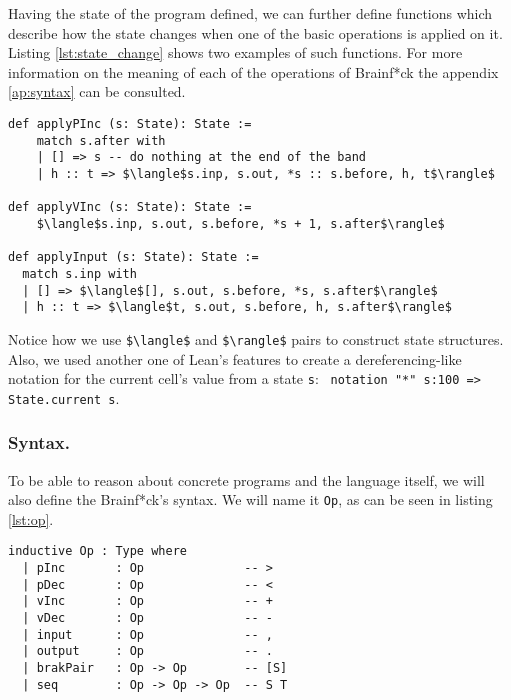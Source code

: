 \documentclass[runningheads]{llncs}
\newcommand{\cc}{\lstinline[mathescape]}
\begin{document}
Having the state of the program defined, we can further define functions which
describe how the state changes when one of the basic operations is applied on
it. Listing \ref{lst:state_change} shows two examples of such functions. For
more information on the meaning of each of the operations of Brainf*ck the
appendix \ref{ap:syntax} can be consulted.

\vspace{2mm}
\begin{lstlisting}[mathescape, label=lst:state_change, 
    caption={Implementations for functions which modify the state
    after pointer increase (\cc{>}), value increase (\cc{+}) and
    input (\cc{,}) operations.}]
def applyPInc (s: State): State :=
    match s.after with
    | [] => s -- do nothing at the end of the band
    | h :: t => $\langle$s.inp, s.out, *s :: s.before, h, t$\rangle$

def applyVInc (s: State): State := 
    $\langle$s.inp, s.out, s.before, *s + 1, s.after$\rangle$

def applyInput (s: State): State :=
  match s.inp with
  | [] => $\langle$[], s.out, s.before, *s, s.after$\rangle$
  | h :: t => $\langle$t, s.out, s.before, h, s.after$\rangle$
\end{lstlisting}

Notice how we use \cc{$\langle$} and \cc{$\rangle$} pairs to construct state
structures. Also, we used another one of Lean's features to create a
dereferencing-like notation for the current cell's value from a state \cc{s}:
\ \cc{notation "*" s:100 => State.current s}.

\vspace{-3mm}
\subsubsection{Syntax.} 

To be able to reason about concrete programs and the language itself, we will
also define the Brainf*ck's syntax. We will name it \cc{Op}, as can be seen in
listing \ref{lst:op}.

\vspace{5mm}
\begin{lstlisting}[label=lst:op, caption=Syntax of the language implemented
    in Lean.]
inductive Op : Type where
  | pInc       : Op              -- >
  | pDec       : Op              -- <
  | vInc       : Op              -- +
  | vDec       : Op              -- -
  | input      : Op              -- ,
  | output     : Op              -- .
  | brakPair   : Op -> Op        -- [S] 
  | seq        : Op -> Op -> Op  -- S T 
\end{lstlisting}
\end{document}
